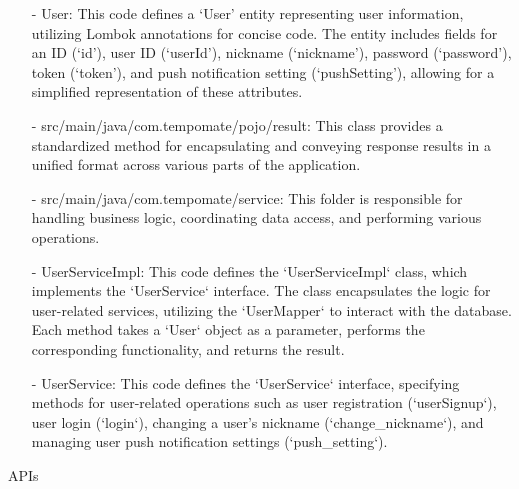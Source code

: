 \begin{enumerate}
                        \item[-] User: This code defines a ‘User' entity representing user information, utilizing Lombok annotations for concise code. The entity includes fields for an ID (‘id’), user ID (‘userId’), nickname (‘nickname’), password (‘password’), token (‘token’), and push notification setting (‘pushSetting’), allowing for a simplified representation of these attributes.\\
                        \item[-] src/main/java/com.tempomate/pojo/result: This class provides a standardized method for encapsulating and conveying response results in a unified format across various parts of the application.\\
                        \item[-] src/main/java/com.tempomate/service: This folder is responsible for handling business logic, coordinating data access, and performing various operations.\\
                        \item[-] UserServiceImpl: This code defines the `UserServiceImpl` class, which implements the `UserService` interface. The class encapsulates the logic for user-related services, utilizing the `UserMapper` to interact with the database. Each method takes a `User` object as a parameter, performs the corresponding functionality, and returns the result.\\
                        \item[-] UserService: This code defines the `UserService` interface, specifying methods for user-related operations such as user registration (`userSignup`), user login (`login`), changing a user's nickname (`change\_nickname`), and managing user push notification settings (`push\_setting`).\\
                    \end{enumerate}
              \item APIs
